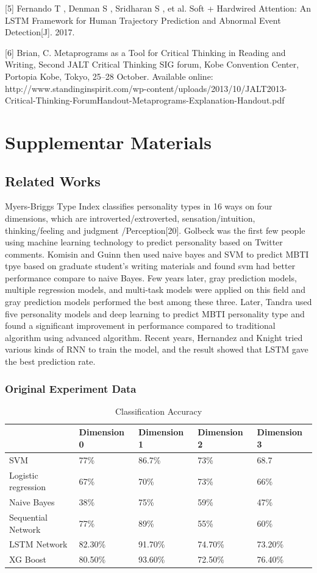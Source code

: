 \documentclass{article}
\begin{document}
[5] Fernando T , Denman S , Sridharan S , et al. Soft + Hardwired Attention: An LSTM Framework for Human Trajectory Prediction and Abnormal Event Detection[J]. 2017.

[6] Brian, C. Metaprograms as a Tool for Critical Thinking in Reading and Writing, Second JALT Critical Thinking SIG forum, Kobe Convention Center, Portopia Kobe, Tokyo, 25–28 October. Available online: http://www.standinginspirit.com/wp-content/uploads/2013/10/JALT2013-Critical-Thinking-ForumHandout-Metaprograms-Explanation-Handout.pdf 


 
 
\section{Supplementar Materials}

\subsection{Related Works}
 Myers-Briggs Type Index classifies personality types in 16 ways on four dimensions, which are introverted/extroverted,  sensation/intuition, thinking/feeling and judgment /Perception[20]. Golbeck was the first few people using machine learning technology to predict personality based on Twitter comments. Komisin and Guinn then used naive bayes and SVM to predict MBTI tpye based on graduate student's writing materials and found svm had better performance compare to naive Bayes. Few years later, gray prediction models, multiple regression models, and multi-task models were applied on this field and gray prediction models performed the best among these three. Later, Tandra used five personality models and deep learning to predict MBTI personality type and found a significant improvement in performance compared to traditional algorithm using advanced algorithm. Recent years, Hernandez and Knight tried various kinds of RNN to train the model, and the result showed that LSTM gave the best prediction rate.
 
\subsubsection{Original Experiment Data}
\begin{table}[h]
	\vspace{20pt}
	\centering
	\begin{tabular}{lllll}
		\hline  
		  & Dimension 0 & Dimension 1 & Dimension 2 & Dimension 3\\
		  \hline  
		  SVM & 77\% & 86.7\% & 73\% & 68.7 \\ 
		Logistic regression & 67\% & 70\% & 73\% & 66\% \\
		Naive Bayes	& 38\%	& 75\% & 59\% &47\% \\
		Sequential Network & 77\% &	89\% & 55\% & 60\% \\
		LSTM Network & 82.30\% & 91.70\% & 74.70\% & 73.20\% \\
		XG Boost & 80.50\% & 93.60\% & 72.50\%	& 76.40\% \\
		\hline       
	\end{tabular}
	\caption{Classification Accuracy}
\label{bs}
\end{table}
\end{document}
